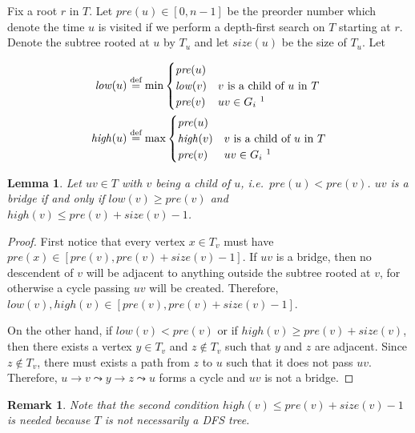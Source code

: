 \documentclass[11pt]{article}
\newtheorem{lemma}[theorem]{Lemma}
\newtheorem{remark}[theorem]{Remark}
\newcommand{\defeq}{\stackrel{\textrm{def}}{=}}
\begin{document}
\renewcommand\thefootnote{\fnsymbol{footnote}}
Fix a root $r$ in $T$. Let $\mathit{pre}(u) \in [0,n-1]$ be the preorder number which denote the time $u$ is visited if we perform a depth-first search on $T$ starting at $r$. Denote the subtree rooted at $u$ by $T_u$ and let $\mathit{size}(u)$ be the size of $T_u$. Let
\addtocounter{footnote}{1} 
\begin{align*}
\mathit{low}(u) &\defeq \min \begin{cases}\mathit{pre}(u) \\ \mathit{low}(v) & \mbox{$v$ is a child of $u$ in $T$} \\ \mathit{pre}(v) & \mbox{$uv \in G_i $ \footnotemark}\end{cases}
\\ \mathit{high}(u) &\defeq \max \begin{cases}\mathit{pre}(u) \\ \mathit{high}(v) & \mbox{$v$ is a child of $u$ in $T$} \\ \mathit{pre}(v) & \mbox{$uv \in G_i$ \addtocounter{footnote}{-1}\footnotemark }\end{cases}
\end{align*}
\begin{lemma}Let $uv \in T$ with $v$ being a child of $u$, i.e.~$\mathit{pre}(u) < \mathit{pre}(v)$. $uv$ is a bridge if and only if $\mathit{low}(v) \geq \mathit{pre}(v)$ and $\mathit{high}(v) \leq \mathit{pre}(v) + \mathit{size}(v) - 1$.\end{lemma}
\begin{proof}
First notice that every vertex $x \in T_v$ must have $\mathit{pre}(x) \in [\mathit{pre}(v), \mathit{pre}(v) + \mathit{size}(v) - 1]$. If $uv$ is a bridge, then no descendent of $v$ will be adjacent to anything outside the subtree rooted at $v$, for otherwise a cycle passing $uv$ will be created. Therefore, $\mathit{low}(v), \mathit{high}(v) \in [\mathit{pre}(v), \mathit{pre}(v) + \mathit{size}(v) - 1]$.

On the other hand, if $\mathit{low}(v) < \mathit{pre}(v)$ or if $\mathit{high}(v) \geq \mathit{pre}(v) + \mathit{size}(v)$, then there exists a vertex $y \in T_v$ and $z \notin T_v$ such that $y$ and $z$ are adjacent. Since $z \notin T_v$, there must exists a path from $z$ to $u$ such that it does not pass $uv$. Therefore, $u \to v \leadsto y \to z \leadsto u$ forms a cycle and $uv$ is not a bridge.
\end{proof}
\begin{remark}Note that the second condition $\mathit{high}(v) \leq \mathit{pre}(v) + \mathit{size}(v) - 1$ is needed because $T$ is not necessarily a DFS tree. \end{remark}
\end{document}
